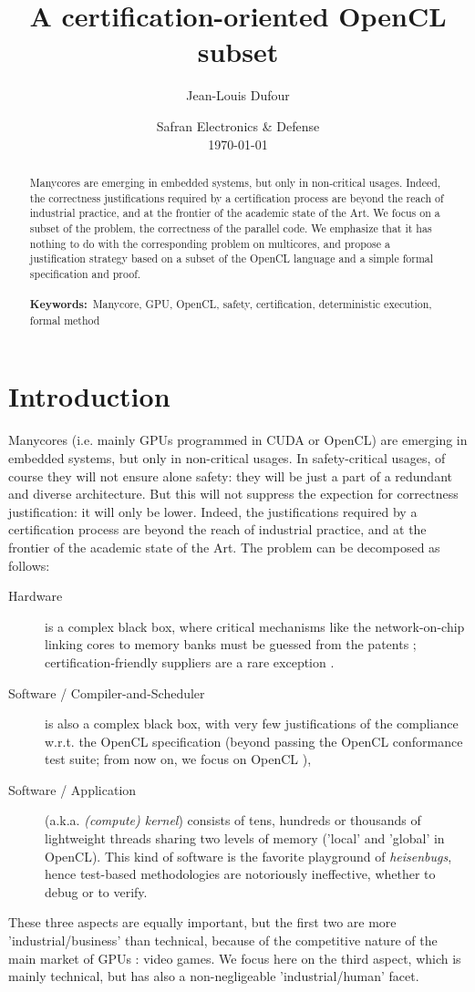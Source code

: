 \documentclass[a4paper,10pt]{article} %
\title{A certification-oriented OpenCL subset}
\author{Jean-Louis Dufour}
\date{Safran Electronics \& Defense\\
\today
}
\begin{document}
\maketitle

\begin{abstract}
Manycores are emerging in embedded systems, but only in non-critical usages.
Indeed, the correctness justifications required by a certification process are  beyond the reach of industrial practice,
and at the frontier of the academic state of the Art.
We focus on a subset of the problem, the correctness of the parallel code.
We emphasize that it has nothing to do with the corresponding problem on multicores,
and propose a justification strategy based on a subset of the OpenCL language and a simple formal specification and proof.
\\\\
\textbf{Keywords:}\ Manycore, GPU, OpenCL, safety, certification, deterministic execution, formal method
\end{abstract}



\section{Introduction}

Manycores (i.e. mainly GPUs programmed in CUDA or OpenCL) are emerging in embedded systems, but only in non-critical usages.
In safety-critical usages, of course they will not ensure alone safety: they will be just a part of a redundant and diverse architecture.
But this will not suppress  the expection for correctness justification:  it will only be lower.
Indeed, the justifications required by a certification process are  beyond the reach of industrial practice,
and at the frontier of the academic state of the Art.
The problem can be decomposed as follows:
\begin{description}
\item[Hardware] is a complex black box, where critical mechanisms like the network-on-chip linking cores to memory banks must be guessed from the patents  \cite{aamodt2018general}; certification-friendly suppliers are a rare exception \cite{boyer2018computing}.
\item[Software / Compiler-and-Scheduler] is also a complex black box, with very few justifications of the compliance w.r.t. the OpenCL specification (beyond passing the OpenCL conformance test suite; from now on, we focus on OpenCL \cite{munshi2011opencl}),
\item[Software / Application] (a.k.a. \emph{(compute) kernel}) consists of tens, hundreds or thousands of lightweight threads sharing two levels of memory ('local' and 'global' in OpenCL). This kind of software is the favorite playground of \emph{heisenbugs}, hence test-based methodologies are notoriously ineffective, whether to debug or to verify.
\end{description}
These three aspects are equally important, but the first two are more 'industrial/business' than technical, because of the competitive nature of the main market of GPUs : video games. We focus here on the third aspect, which is mainly technical, but has also a non-negligeable 'industrial/human' facet.
\end{document}
